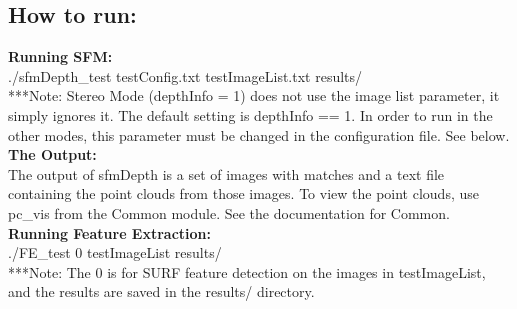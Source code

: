 \subsection{How to run:}
\textbf{Running SFM:} \\
./sfmDepth\_test testConfig.txt testImageList.txt results/ \\
***Note: Stereo Mode (depthInfo = 1) does not use the image list parameter, it simply ignores it. The default setting is depthInfo == 1. In order to run in the other modes, this parameter must be changed in the configuration file. See below. \\
\textbf{The Output:} \\
The output of sfmDepth is a set of images with matches and a text file containing the point clouds from those images. To view the point clouds, use pc\_vis from the Common module. See the documentation for Common. \\
\textbf{Running Feature Extraction:} \\
./FE\_test 0 testImageList results/ \\
***Note: The 0 is for SURF feature detection on the images in testImageList, and the results are saved in the results/ directory.
